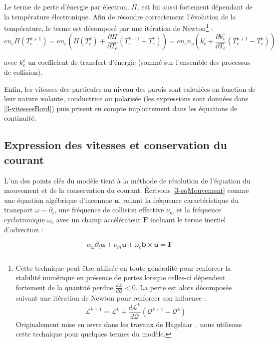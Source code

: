 \begin{refsection}
Le terme de perte d'énergie par électron, $\Pi$, est lui aussi fortement
dépendant de la température électronique. Afin de résoudre correctement
l'évolution de la température, le terme est décomposé par une itération
de Newton\footnote{Cette technique peut être utilisée en toute généralité pour
renforcer la stabilité numérique en présence de pertes lorsque celles-ci
dépendent fortement de la quantité perdue 
$\frac{d\mathcal L}{d\mathcal Q}<0$.
La perte est alors décomposée suivant une itération de Newton pour renforcer son
influence :
\begin{equation*}
\mathcal L^{k+1}=\mathcal L^{k}+\frac{d\mathcal L^{k}}{d\mathcal Q}(\mathcal
Q^{k+1}-\mathcal Q^k) \end{equation*}
Originalement mise en \oe vre dans les travaux de
Hagelaar~\parencite{HagelaarImpl}, nous utilisons cette technique pour quelques
termes du modèle.} :
\begin{equation*}
en_e\Pi(T_e^{k+1})=en_e\left(\Pi(T_e^{k})+\frac{\partial\Pi}{\partial
T_e}\left(T_e^{k+1}-T_e^{k}\right)\right)= en_en_g\left(k_e^\varepsilon+
\frac{\partial k_e^\varepsilon}{\partial T_e}(T_e^{k+1}-T_e^{k})\right)
\end{equation*}

avec $k_e^\varepsilon$ un coefficient de transfert d'énergie (sommé sur 
l'ensemble des processus de collision).

Enfin, les vitesses des particules au niveau des parois sont calculées en
fonction de leur nature isolante, conductrice ou polarisée (les expressions
sont données dans \ref{3-vitessesBord}) puis prisent en compte implicitement
dans les équations de continuité.

\subsection{Expression des vitesses et conservation du courant}
L'un des points clés du modèle tient à la méthode de résolution de l'équation du
mouvement et de la conservation du courant. Écrivons \eqref{3-eqMouvement} comme
une équation algébrique d'inconnue $\mathbf u$, reliant la fréquence caractéristique du transport
$\omega\sim\partial_t$, une fréquence de collision effective $\nu_m$ et la
fréquence cyclotronique $\omega_c$ avec un champ
accélérateur $\mathbf F$ incluant le terme inertiel d'advection :

\begin{equation}
\label{3-eqMvt}
\alpha_\omega\partial_t \mathbf{u} + 
\nu_m\mathbf{u}+\omega_{c}\mathbf{b}\times\mathbf{u}=
\mathbf F
\end{equation}


\end{refsection}
